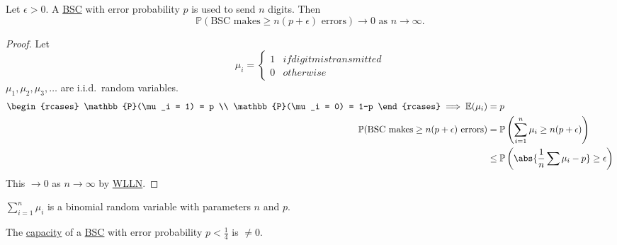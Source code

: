 \documentclass{article}
\newcommand{\Prob}{\mathbb{P}}
\newcommand{\Exp}{\mathbb{E}}
\newcommand{\1}[1]{\mathbbm{1}_{#1}}
\begin{document}
\begin{nlemma}\label{lem:2.8}
    Let $\epsilon > 0$. A \hyperlink{def:bsc}{BSC} with error probability $p$ is used to send $n$ digits. Then
    \begin{equation*}
        \Prob(\text{BSC makes} \geq n(p + \epsilon) \text{ errors}) \to 0 \text{ as } n \to \infty.
    \end{equation*}
\end{nlemma}
\begin{proof}
    Let
    \begin{equation*}
        \mu_i =
        \begin{cases*}
            1 & if digit mistransmitted \\
            0 & otherwise
        \end{cases*}
    \end{equation*}
    $\mu_1, \mu_2, \mu_3, \dotsc$ are i.i.d.\ random variables.
    \begin{align*}
        \begin{rcases}
            \Prob(\mu_i = 1) = p \\
            \Prob(\mu_i = 0) = 1-p
        \end{rcases}
        \implies \Exp(\mu_i) &= p \\
        \Prob(\text{BSC makes} \geq n(p + \epsilon) \text{ errors}) &= \Prob\left(\sum_{i=1}^n \mu_i \geq n(p + \epsilon)\right) \\
                                                                    &\leq \Prob\left(\abs{\frac{1}{n} \sum \mu_i - p} \geq \epsilon\right)
    \end{align*}
    This $\to 0$ as $n \to \infty$ by \hyperlink{def:wlln}{WLLN}.
\end{proof}
\begin{remark}
    $\sum_{i=1}^n \mu_i$ is a binomial random variable with parameters $n$ and $p$.
\end{remark}
\begin{nprop}\label{prop:2.9}
    The \hyperlink{def:capacity}{capacity} of a \hyperlink{def:bsc}{BSC} with error probability $p<\frac{1}{4}$ is $\neq 0$.
\end{nprop}
\end{document}
